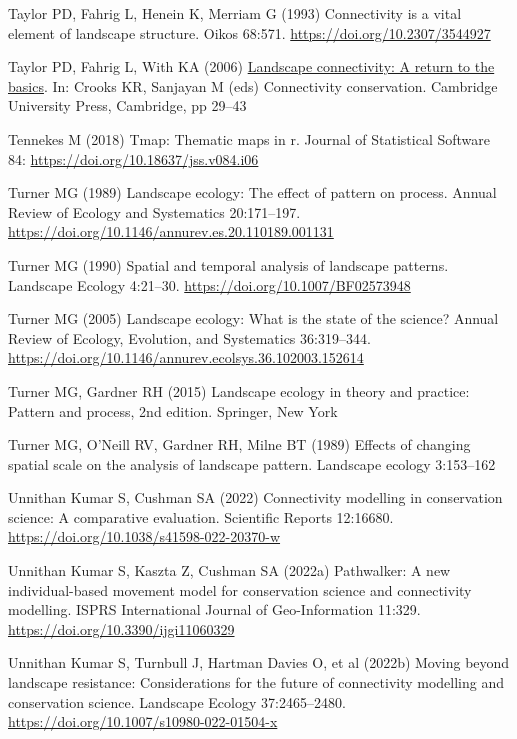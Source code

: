 \documentclass[
  10pt,
  a4paperpaper,
]{article}
\newlength{\cslhangindent}
\newenvironment{CSLReferences}[2] %
 {\begin{list}{}{%
  \setlength{\itemindent}{0pt}
  \setlength{\leftmargin}{0pt}
  \setlength{\parsep}{0pt}
  \ifodd #1
   \setlength{\leftmargin}{\cslhangindent}
   \setlength{\itemindent}{-1\cslhangindent}
  \fi
  \setlength{\itemsep}{#2\baselineskip}}}
 {\end{list}}
\begin{document}
\begin{CSLReferences}{1}{1}
Taylor PD, Fahrig L, Henein K, Merriam G (1993) Connectivity is a vital
element of landscape structure. Oikos 68:571.
\url{https://doi.org/10.2307/3544927}

Taylor PD, Fahrig L, With KA (2006)
\href{https://doi.org/10.1017/CBO9780511754821}{Landscape connectivity:
A return to the basics}. In: Crooks KR, Sanjayan M (eds) Connectivity
conservation. Cambridge University Press, Cambridge, pp 29--43

Tennekes M (2018) Tmap: Thematic maps in r. Journal of Statistical
Software 84: \url{https://doi.org/10.18637/jss.v084.i06}

Turner MG (1989) Landscape ecology: The effect of pattern on process.
Annual Review of Ecology and Systematics 20:171--197.
\url{https://doi.org/10.1146/annurev.es.20.110189.001131}

Turner MG (1990) Spatial and temporal analysis of landscape patterns.
Landscape Ecology 4:21--30. \url{https://doi.org/10.1007/BF02573948}

Turner MG (2005) Landscape ecology: What is the state of the science?
Annual Review of Ecology, Evolution, and Systematics 36:319--344.
\url{https://doi.org/10.1146/annurev.ecolsys.36.102003.152614}

Turner MG, Gardner RH (2015) Landscape ecology in theory and practice:
Pattern and process, 2nd edition. Springer, New York

Turner MG, O'Neill RV, Gardner RH, Milne BT (1989) Effects of changing
spatial scale on the analysis of landscape pattern. Landscape ecology
3:153--162

Unnithan Kumar S, Cushman SA (2022) Connectivity modelling in
conservation science: A comparative evaluation. Scientific Reports
12:16680. \url{https://doi.org/10.1038/s41598-022-20370-w}

Unnithan Kumar S, Kaszta Z, Cushman SA (2022a) Pathwalker: A new
individual-based movement model for conservation science and
connectivity modelling. ISPRS International Journal of Geo-Information
11:329. \url{https://doi.org/10.3390/ijgi11060329}

Unnithan Kumar S, Turnbull J, Hartman Davies O, et al (2022b) Moving
beyond landscape resistance: Considerations for the future of
connectivity modelling and conservation science. Landscape Ecology
37:2465--2480. \url{https://doi.org/10.1007/s10980-022-01504-x}


\end{CSLReferences}
\end{document}
